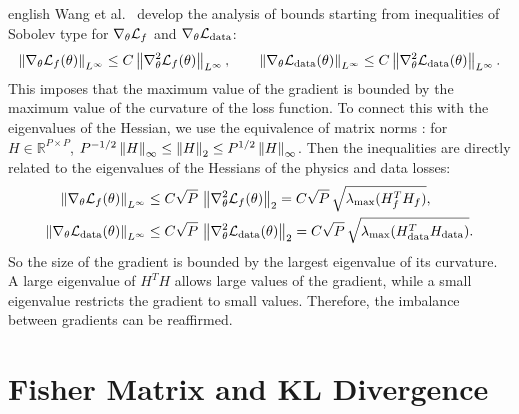 \documentclass[0000.tex]{subfiles}
\begin{document}
\begin{hyphenrules}{english}
Wang et al.~\cite{wang2021gradient} develop the analysis of bounds starting from inequalities of Sobolev type
for $\nabla_\theta\mathcal{L}_f$ and $\nabla_\theta\mathcal{L}_{\mathrm{data}}$:
\begin{equation}
  \left\lVert \nabla_\theta\mathcal{L}_f(\theta) \right\rVert_{L^\infty}\le C\left\lVert \nabla^2_\theta\mathcal{L}_f(\theta) \right\rVert_{L^\infty},\qquad
  \left\lVert \nabla_\theta\mathcal{L}_{\mathrm{data}}(\theta) \right\rVert_{L^\infty}\le C\left\lVert \nabla^2_\theta\mathcal{L}_{\mathrm{data}}(\theta) \right\rVert_{L^\infty}.
  \label{eq:grad-bounds}
\end{equation}
This imposes that the maximum value of the gradient is bounded by the maximum value of the curvature of
the loss function. To connect this with the eigenvalues of the Hessian, we use the equivalence of matrix
norms \cite{trefethen1997}: for $H\in\mathbb{R}^{P\times P}$,
$P^{-1/2}\left\lVert H \right\rVert_\infty\le\left\lVert H \right\rVert_2\le P^{1/2}\left\lVert H \right\rVert_\infty$. Then the inequalities are directly related
to the eigenvalues of the Hessians of the physics and data losses:
\begin{align}
  \left\lVert \nabla_\theta\mathcal{L}_f(\theta) \right\rVert_{L^\infty}&\le C\sqrt{P}\,\left\lVert \nabla^2_\theta\mathcal{L}_f(\theta) \right\rVert_{2}
  =C\sqrt{P}\,\sqrt{\lambda_{\max}(H_f^{T}H_f)}, \label{eq:bound-f}\\
  \left\lVert \nabla_\theta\mathcal{L}_{\mathrm{data}}(\theta) \right\rVert_{L^\infty}&\le C\sqrt{P}\,\left\lVert \nabla^2_\theta\mathcal{L}_{\mathrm{data}}(\theta) \right\rVert_{2}
  =C\sqrt{P}\,\sqrt{\lambda_{\max}(H_{\mathrm{data}}^{T}H_{\mathrm{data}})}. \label{eq:bound-data}
\end{align}
So the size of the gradient is bounded by the largest eigenvalue of its curvature. A large eigenvalue of
$H^{T}H$ allows large values of the gradient, while a small eigenvalue restricts the gradient to small
values. Therefore, the imbalance between gradients can be reaffirmed.


\section{Fisher Matrix and KL Divergence}\label{app:fisher}


\end{hyphenrules}
\end{document}
